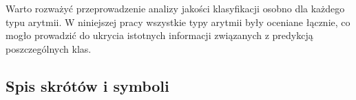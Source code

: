 \documentclass[a4paper,twoside,12pt]{book}
\begin{document}
Warto rozważyć przeprowadzenie analizy jakości klasyfikacji osobno dla każdego typu arytmii. W niniejszej pracy wszystkie typy arytmii były oceniane łącznie, co mogło prowadzić do ukrycia istotnych informacji związanych z predykcją poszczególnych klas.




%  

\backmatter

\printbibliography           %

\begin{appendices}



	\chapter{Spis skrótów i symboli}


\end{appendices}
\end{document}
